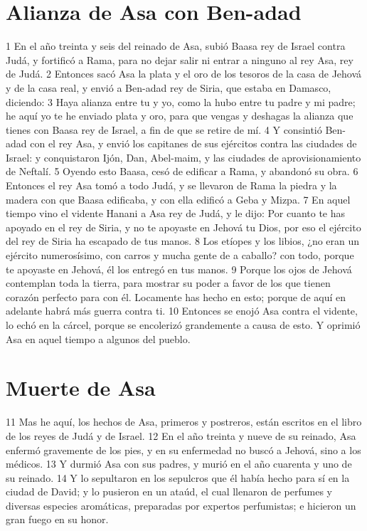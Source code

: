 \section*{Alianza de Asa con Ben-adad}

 

1 En el año treinta y seis del reinado de Asa, subió Baasa rey de Israel contra Judá, y fortificó a Rama, para no dejar salir ni entrar a ninguno al rey Asa, rey de Judá.
2 Entonces sacó Asa la plata y el oro de los tesoros de la casa de Jehová y de la casa real, y envió a Ben-adad rey de Siria, que estaba en Damasco, diciendo:
3 Haya alianza entre tu y yo, como la hubo entre tu padre y mi padre; he aquí yo te he enviado plata y oro, para que vengas y deshagas la alianza que tienes con Baasa rey de Israel, a fin de que se retire de mí.
4 Y consintió Ben-adad con el rey Asa, y envió los capitanes de sus ejércitos contra las ciudades de Israel: y conquistaron Ijón, Dan, Abel-maim, y las ciudades de aprovisionamiento de Neftalí.
5 Oyendo esto Baasa, cesó de edificar a Rama, y abandonó su obra.
6 Entonces el rey Asa tomó a todo Judá, y se llevaron de Rama la piedra y la madera con que Baasa edificaba, y con ella edificó a Geba y Mizpa.
7 En aquel tiempo vino el vidente Hanani a Asa rey de Judá, y le dijo: Por cuanto te has apoyado en el rey de Siria, y no te apoyaste en Jehová tu Dios, por eso el ejército del rey de Siria ha escapado de tus manos.
8 Los etíopes y los libios, ¿no eran un ejército numerosísimo, con carros y mucha gente de a caballo? con todo, porque te apoyaste en Jehová, él los entregó en tus manos.
9 Porque los ojos de Jehová contemplan toda la tierra, para mostrar su poder a favor de los que tienen corazón perfecto para con él. Locamente has hecho en esto; porque de aquí en adelante habrá más guerra contra ti.
10 Entonces se enojó Asa contra el vidente, lo echó en la cárcel, porque se encolerizó grandemente a causa de esto. Y oprimió Asa en aquel tiempo a algunos del pueblo.
\section*{Muerte de Asa}

 
11 Mas he aquí, los hechos de Asa, primeros y postreros, están escritos en el libro de los reyes de Judá y de Israel.
12 En el año treinta y nueve de su reinado, Asa enfermó gravemente de los pies, y en su enfermedad no buscó a Jehová, sino a los médicos.
13 Y durmió Asa con sus padres, y murió en el año cuarenta y uno de su reinado.
14 Y lo sepultaron en los sepulcros que él había hecho para sí en la ciudad de David;
y lo pusieron en un ataúd, el cual llenaron de perfumes y diversas especies aromáticas, preparadas por expertos perfumistas; e hicieron un gran fuego en su honor.

